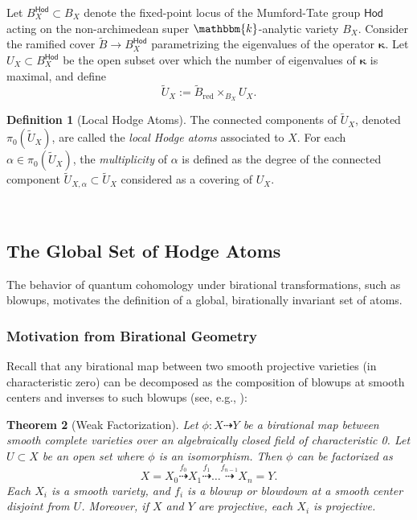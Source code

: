 \documentclass[12pt,a4paper]{amsart}
\newtheorem{theorem}{Theorem}[section]
\theoremstyle{definition}
\newtheorem{definition}[theorem]{Definition}
\theoremstyle{remark}
\begin{document}
Let \( B^{\mathsf{Hod}}_X \subset B_X \) denote the fixed-point locus of the Mumford-Tate group \( \mathsf{Hod} \) acting on the non-archimedean super \( \mathbbm{k} \)-analytic variety \( B_X \). Consider the ramified cover \( \widetilde{B} \to B^{\mathsf{Hod}}_X \) parametrizing the eigenvalues of the operator \( \boldsymbol{\kappa} \). Let \( U_X \subset B^{\mathsf{Hod}}_X \) be the open subset over which the number of eigenvalues of \( \boldsymbol{\kappa} \) is maximal, and define
\[
\widetilde{U}_X := \widetilde{B}_{\mathrm{red}} \times_{B_X} U_X.
\]
\begin{definition}[Local Hodge Atoms]
    The connected components of \( \widetilde{U}_X \), denoted \( \pi_0(\widetilde{U}_X) \), are called the \emph{local Hodge atoms} associated to \( X \). For each \( \alpha \in \pi_0(\widetilde{U}_X) \), the \emph{multiplicity} of \( \alpha \) is defined as the degree of the connected component \( \widetilde{U}_{X, \alpha} \subset \widetilde{U}_X \) considered as a covering of \( U_X \).
\end{definition}

\ 

\subsection{The Global Set of Hodge Atoms}
\label{sec:global-hodge-atoms}

The behavior of quantum cohomology under birational transformations, such as blowups, motivates the definition of a global, birationally invariant set of atoms.

\subsubsection{Motivation from Birational Geometry}
\label{sec:atoms-and-birational-geometry}

Recall that any birational map between two smooth projective varieties (in characteristic zero) can be decomposed as the composition of blowups at smooth centers and inverses to such blowups (see, e.g., \cites{AbramovichKaruMatsukiWlodarczyk2002, Wlodarczyk2000}):
\begin{theorem}[Weak Factorization]\label{thm:weak}
    Let $\phi: X\dashrightarrow Y$ be a birational map between smooth complete varieties over an algebraically closed field of characteristic 0. Let $U\subset X$ be an open set where $\phi$ is an isomorphism. Then $\phi$ can be factorized as
    \[X=X_0\stackrel{f_0}{\dashrightarrow}X_1\stackrel{f_1}{\dashrightarrow}\ldots\stackrel{f_{n-1}}{\dashrightarrow}X_n=Y.\]
    Each $X_i$ is a smooth variety, and $f_i$ is a blowup or blowdown at a smooth center disjoint from $U$. Moreover, if $X$ and $Y$ are projective, each $X_i$ is projective.
\end{theorem}
\end{document}
